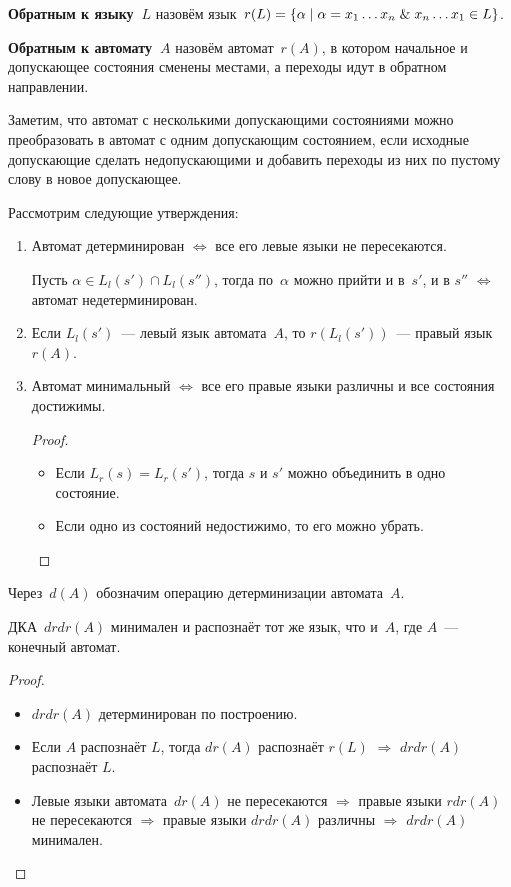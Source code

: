 \textbf{Обратным к языку~$L$} назовём язык~$r(L) = \{ \alpha \mid \alpha = x_1 \ldots x_n \mathrel{\&} x_n \ldots x_1 \in L \}$.

\textbf{Обратным к автомату~$A$} назовём автомат~$r(A)$, в котором начальное и допускающее состояния сменены местами, а переходы идут в обратном направлении.

Заметим, что автомат с несколькими допускающими состояниями можно преобразовать в автомат с одним допускающим состоянием, если исходные допускающие сделать недопускающими и добавить переходы из них по пустому слову в новое допускающее.

Рассмотрим следующие утверждения:
\begin{enumerate}
	\item Автомат детерминирован $\Leftrightarrow$ все его левые языки не пересекаются.
	\begin{proofcontra}
	Пусть $\alpha \in L_l(s') \cap L_l(s'')$, тогда по~$\alpha$ можно прийти и в~$s'$, и в $s''$ $\Leftrightarrow$ автомат недетерминирован.
	\end{proofcontra}
	
	\item Если $L_l(s')$~--- левый язык автомата~$A$, то $r(L_l(s'))$~--- правый язык~$r(A)$.
	
	\item Автомат минимальный $\Leftrightarrow$ все его правые языки различны и все состояния достижимы.
	\begin{proof}
	\begin{itemize}
		\item Если $L_r(s) = L_r(s')$, тогда $s$ и $s'$ можно объединить в одно состояние.
		\item Если одно из состояний недостижимо, то его можно убрать.
	\end{itemize}
	\end{proof}
\end{enumerate}

Через~$d(A)$ обозначим операцию детерминизации автомата~$A$.

\begin{theorem}[Бржозовского]
ДКА~$drdr(A)$ минимален и распознаёт тот же язык, что и~$A$, где $A$~--- конечный автомат.
\end{theorem}
\begin{proof}
\begin{itemize}
	\item $drdr(A)$ детерминирован по построению.
	\item Если $A$ распознаёт $L$, тогда $dr(A)$ распознаёт $r(L)$ $\Rightarrow$ $drdr(A)$ распознаёт $L$.
	\item Левые языки автомата~$dr(A)$ не пересекаются $\Rightarrow$ правые языки $rdr(A)$ не пересекаются $\Rightarrow$ правые языки $drdr(A)$ различны $\Rightarrow$ $drdr(A)$ минимален.
\end{itemize}
\end{proof}